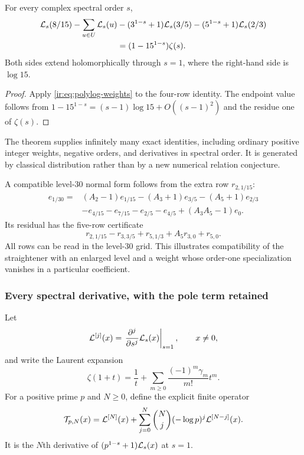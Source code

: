 \begin{theorem}
\label{ir:thm:level15}
For every complex spectral order $s$,
\begin{align}
 \mathcal L_{s}(8/15)-\sum_{u\in U}\mathcal L_{s}(u)
 &-(3^{1-s}+1)\mathcal L_{s}(3/5)
  -(5^{1-s}+1)\mathcal L_{s}(2/3)\nonumber\\
 &=(1-15^{1-s})\zeta(s).
 \label{ir:eq:level15}
\end{align}
Both sides extend holomorphically through $s=1$, where the right-hand
side is $\log15$.
\end{theorem}
\begin{proof}
Apply \eqref{ir:eq:polylog-weights} to the four-row identity.
The endpoint value follows from
$1-15^{1-s}=(s-1)\log15+O((s-1)^2)$ and the residue one of
$\zeta(s)$.
\end{proof}
The theorem supplies infinitely many exact identities, including
ordinary positive integer weights, negative orders, and derivatives
in spectral order. It is generated by classical distribution rather
than by a new numerical relation conjecture.

A compatible level-$30$ normal form follows from the extra row
$r_{2,1/15}$:
\begin{align}
 e_{1/30}={}&(A_2-1)e_{1/15}-(A_3+1)e_{3/5}
 -(A_5+1)e_{2/3}\nonumber\\
 &-e_{4/15}-e_{7/15}-e_{2/5}-e_{4/5}
 +(A_3A_5-1)e_0.\label{ir:eq:level30-normal}
\end{align}
Its residual has the five-row certificate
\[
 r_{2,1/15}-r_{3,3/5}+r_{5,1/3}+A_5r_{3,0}+r_{5,0}.
\]
All rows can be read in the level-$30$ grid. This illustrates
compatibility of the straightener with an enlarged level and a
weight whose order-one specialization vanishes in a particular
coefficient.

\subsubsection{Every spectral derivative, with the pole term retained}
Let
\[
 \mathcal L^{[j]}(x)=\left.\frac{\partial^j}{\partial s^j}\mathcal L_{s}(x)
                   \right|_{s=1},\qquad x\ne0,
\]
and write the Laurent expansion
\begin{equation}\label{ir:eq:stieltjes}
 \zeta(1+t)=\frac1t+\sum_{m\ge0}\frac{(-1)^m\gamma_m}{m!}t^m.
\end{equation}
For a positive prime $p$ and $N\ge0$, define the explicit finite operator
\begin{equation}\label{ir:eq:T-operator}
 \mathcal T_{p,N}(x)=\mathcal L^{[N]}(x)
 +\sum_{j=0}^{N}\binom Nj(-\log p)^j\mathcal L^{[N-j]}(x).
\end{equation}
It is the $N$th derivative of
$(p^{1-s}+1)\mathcal L_{s}(x)$ at $s=1$.

